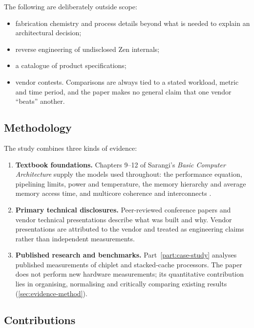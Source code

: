 The following are deliberately outside scope:

\begin{itemize}
  \item fabrication chemistry and process details beyond what is needed to explain an architectural decision;
  \item reverse engineering of undisclosed Zen internals;
  \item a catalogue of product specifications;
  \item vendor contests. Comparisons are always tied to a stated workload, metric and time period, and the paper makes no general claim that one vendor ``beats'' another.
\end{itemize}

\subsection{Methodology}
\label{sec:method-overview}

The study combines three kinds of evidence:

\begin{enumerate}
  \item \textbf{Textbook foundations.} Chapters 9--12 of Sarangi's \emph{Basic Computer Architecture} supply the models used throughout: the performance equation, pipelining limits, power and temperature, the memory hierarchy and average memory access time, and multicore coherence and interconnects \cite{sarangi2025basic}.
  \item \textbf{Primary technical disclosures.} Peer-reviewed conference papers and vendor technical presentations describe what was built and why. Vendor presentations are attributed to the vendor and treated as engineering claims rather than independent measurements.
  \item \textbf{Published research and benchmarks.} Part~\ref{part:case-study} analyses published measurements of chiplet and stacked-cache processors. The paper does not perform new hardware measurements; its quantitative contribution lies in organising, normalising and critically comparing existing results (\cref{sec:evidence-method}).
\end{enumerate}

\subsection{Contributions}
\label{sec:contributions}

